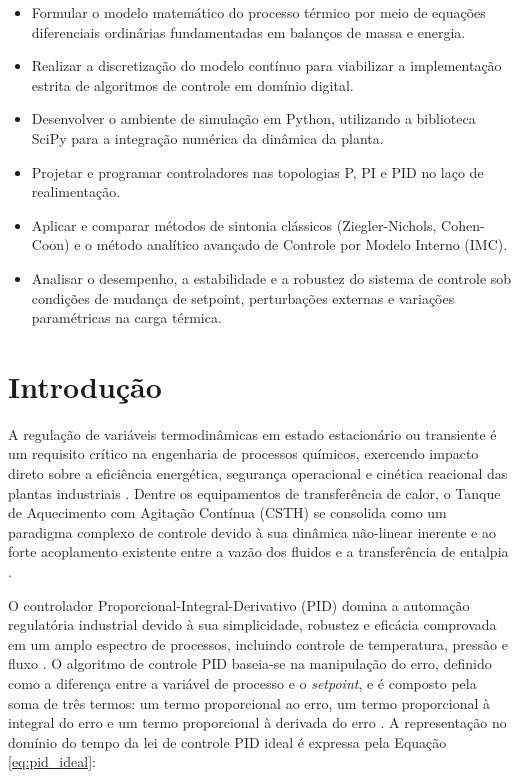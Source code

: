 \documentclass[12pt, a4paper]{article}
\begin{document}
\begin{itemize}
    \item Formular o modelo matemático do processo térmico por meio de equações diferenciais ordinárias fundamentadas em balanços de massa e energia.
    \item Realizar a discretização do modelo contínuo para viabilizar a implementação estrita de algoritmos de controle em domínio digital.
    \item Desenvolver o ambiente de simulação em Python, utilizando a biblioteca SciPy para a integração numérica da dinâmica da planta.
    \item Projetar e programar controladores nas topologias P, PI e PID no laço de realimentação.
    \item Aplicar e comparar métodos de sintonia clássicos (Ziegler-Nichols, Cohen-Coon) e o método analítico avançado de Controle por Modelo Interno (IMC).
    \item Analisar o desempenho, a estabilidade e a robustez do sistema de controle sob condições de mudança de setpoint, perturbações externas e variações paramétricas na carga térmica.
\end{itemize}

\newpage
\section{Introdução}

A regulação de variáveis termodinâmicas em estado estacionário ou transiente é um requisito crítico na engenharia de processos químicos, exercendo impacto direto sobre a eficiência energética, segurança operacional e cinética reacional das plantas industriais \cite{sen2004}. Dentre os equipamentos de transferência de calor, o Tanque de Aquecimento com Agitação Contínua (CSTH) se consolida como um paradigma complexo de controle devido à sua dinâmica não-linear inerente e ao forte acoplamento existente entre a vazão dos fluidos e a transferência de entalpia \cite{dhanasekar2024}.

O controlador Proporcional-Integral-Derivativo (PID) domina a automação regulatória industrial devido à sua simplicidade, robustez e eficácia comprovada em um amplo espectro de processos, incluindo controle de temperatura, pressão e fluxo \cite{stanisic2025}. O algoritmo de controle PID baseia-se na manipulação do erro, definido como a diferença entre a variável de processo e o \textit{setpoint}, e é composto pela soma de três termos: um termo proporcional ao erro, um termo proporcional à integral do erro e um termo proporcional à derivada do erro \cite{khare2010}. A representação no domínio do tempo da lei de controle PID ideal é expressa pela Equação \ref{eq:pid_ideal}:
\end{document}

